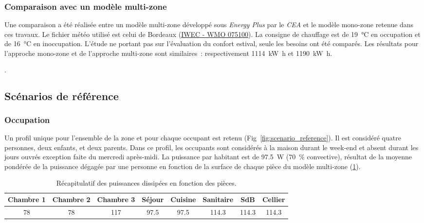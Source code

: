 \subsubsection{Comparaison avec un modèle multi-zone} %
\label{ssub:comparaison_avec_un_modele_multi_zone}
Une comparaison a été réalisée
entre un modèle multi-zone développé sous \emph{Energy Plus} par le
\emph{CEA} et le modèle mono-zone retenue dans ces travaux. Le fichier météo utilisé est celui de
Bordeaux (\href{https://www.energyplus.net/weather-download/europe_wmo_region_6/FRA//FRA_Bordeaux.075100_IWEC/all}{IWEC - WMO 075100}).
La consigne de chauffage est de \SI{19}{\celsius} en occupation et de \SI{16}{\celsius} en inoccupation.
L’étude ne portant pas sur l’évaluation du confort estival,
seule les besoins ont été comparés. Les résultats pour l’approche mono-zone et de l’approche multi-zone sont similaires~:
respectivement \SI{1114}{\kilo\watt\hour} et \SI{1190}{\kilo\watt\hour}.

.


\subsection{Scénarios de référence} %
\label{sub:scénarios_de_référence}
\subsubsection{Occupation} %
\label{ssub:profil_d_occupation}
Un profil unique pour l’ensemble de la zone et pour chaque occupant est retenu
(Fig~\ref{fig:scenario_reference}). Il est considéré quatre personnes, deux enfants, et deux parents. Dans ce profil,
les occupants sont considérés à la maison durant le week-end et absent durant les jours
ouvrés exception faite du mercredi après-midi.
La puissance par habitant est de \SI{97.5}{\watt} (\SI{70}{\percent} convective), résultat
de la moyenne pondérée de la puissance dégagée par une personne en fonction de la surface
de chaque pièce du modèle multi-zone (\ref{tab:puissance_occupants}).

\begin{table}
\centering
{}
\caption{Récapitulatif des puissances dissipées en fonction des pièces.}
\label{tab:puissance_occupants}
\begin{tabular}{*8{c}}
    \toprule
    Chambre 1 & Chambre 2  & Chambre 3 & Séjour     & Cuisine    & Sanitaire   & SdB         & Cellier     \\
    \midrule
    \num{78}  & \num{78}   & \num{117} & \num{97.5} & \num{97.5} & \num{114.3} & \num{114.3} & \num{114.3} \\
    \bottomrule
\end{tabular}
\end{table}


